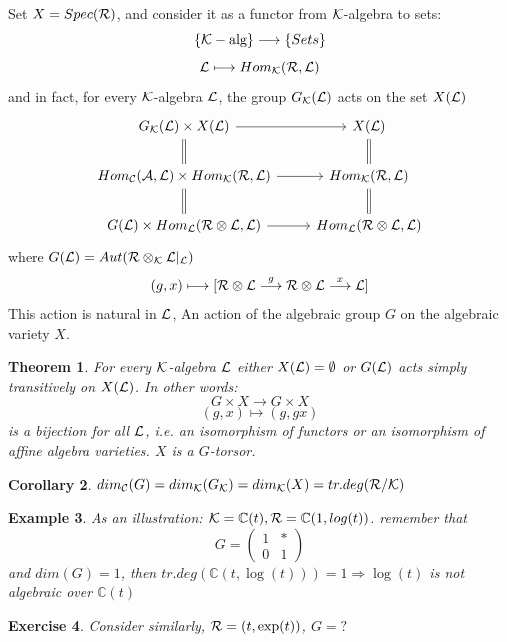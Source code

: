 \documentclass[11pt]{article}
\newtheorem{thm}{Theorem}[section]
\newtheorem{exercise}[thm]{Exercise}
\newtheorem{cor}[thm]{Corollary}
\newtheorem{ex}[thm]{Example}
\newcommand{\cplx}{\mathbb C}
\newcommand{\cala}{{\cal A}}
\newcommand{\calc}{{\cal C}}
\newcommand{\calk}{{\cal K}}
\newcommand{\call}{{\cal L}}
\newcommand{\calr}{{\cal R}}
\newcommand{\Lrta}{\Longrightarrow}
\newcommand{\lrta}{\longrightarrow}
\begin{document}
Set $X=Spec(\calr)$, and consider it as a functor from $\calk$-algebra to sets:
$$
\{\calk-\text{alg}\}\lrta\{Sets\}
$$
$$
\call\longmapsto Hom_\calk(\calr,\call)
$$
and in fact, for every $\calk$-algebra $\call$, the group $G_\calk(\call)$ acts on the set $X(\call)$
\[
\begin{tikzcd}
G_\calk(\call)\times X(\call)\ar[d,equal]\ar[r]& X(\call)\ar[d,equal]\\
Hom_\calc(\cala,\call)\times Hom_\calk(\calr,\call)\ar[d,equal]\ar[r]& Hom_{\calk}(\calr,\call)\ar[d,equal]\\
G(\call)\times Hom_\call(\calr\otimes \call,\call)\ar[r] & Hom_\call(\calr\otimes \call,\call)
\end{tikzcd}
\]
{\color{red}where $G(\call)=Aut(\calr\otimes_\calk \call|_\call)$} 
$$
(g,x)\longmapsto[\calr\otimes\call\overset{g}{\lrta}\calr\otimes \call\overset{x}{\lrta}\call]
$$
This action is natural in $\call$, An action of the algebraic group $G$ on the algebraic variety $X$.

\begin{thm}
For every $\calk$-algebra $\call$ either $X(\call)=\emptyset$ or $G(\call)$ acts simply transitively on $X(\call)$. In other words:
$$
G\times X\lrta G\times X
$$
$$
(g,x)\longmapsto (g,gx)
$$
is a bijection for all $\call$, i.e. an isomorphism of functors or an isomorphism of affine algebra varieties. $X$ is a $G$-torsor.
\end{thm}
\begin{cor}
$dim_\calc(G)=dim_\calk(G_\calk)=dim_\calk(X)=tr.deg(\calr/\calk)$
\end{cor}
\begin{ex}
As an illustration: $\calk=\cplx(t),\calr=\cplx(1,log(t))$. remember that 
$$
G=\begin{pmatrix*}
1 & *\\
0& 1
\end{pmatrix*}
$$
and $dim(G)=1$, then $tr.deg(\cplx(t,\log(t)))=1\Lrta \log (t) $ is not algebraic over $\cplx(t)$ 
\end{ex}

\begin{exercise}
Consider similarly, $\calr=(t,\exp(t))$, $G=?$
\end{exercise}
\end{document}
